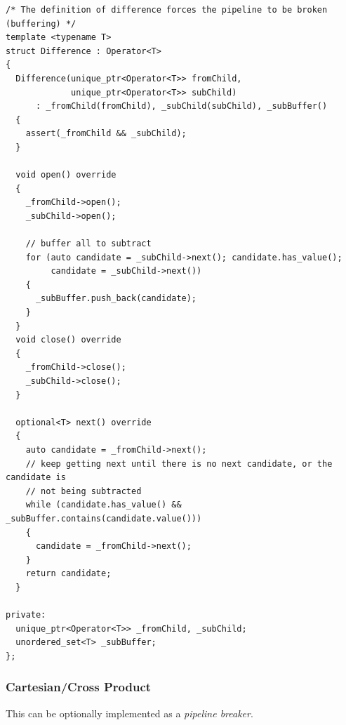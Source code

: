 \begin{verbatim}
/* The definition of difference forces the pipeline to be broken (buffering) */
template <typename T>
struct Difference : Operator<T>
{
  Difference(unique_ptr<Operator<T>> fromChild,
             unique_ptr<Operator<T>> subChild)
      : _fromChild(fromChild), _subChild(subChild), _subBuffer()
  {
    assert(_fromChild && _subChild);
  }

  void open() override
  {
    _fromChild->open();
    _subChild->open();

    // buffer all to subtract
    for (auto candidate = _subChild->next(); candidate.has_value();
         candidate = _subChild->next())
    {
      _subBuffer.push_back(candidate);
    }
  }
  void close() override
  {
    _fromChild->close();
    _subChild->close();
  }

  optional<T> next() override
  {
    auto candidate = _fromChild->next();
    // keep getting next until there is no next candidate, or the candidate is
    // not being subtracted
    while (candidate.has_value() && _subBuffer.contains(candidate.value()))
    {
      candidate = _fromChild->next();
    }
    return candidate;
  }

private:
  unique_ptr<Operator<T>> _fromChild, _subChild;
  unordered_set<T> _subBuffer;
};
\end{verbatim}

\subsubsection{Cartesian/Cross Product}
This can be optionally implemented as a \textit{pipeline breaker}.

